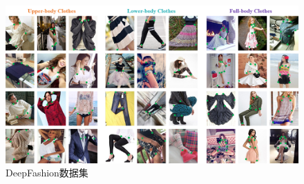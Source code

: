 \begin{figure}[h]
  \centering
  \includegraphics[width=0.9\linewidth]{Img/deepfashion.jpg}
  \caption{DeepFashion数据集\cite{liu2016deepfashion}}
  \label{fig:deepfashion}
\end{figure}

